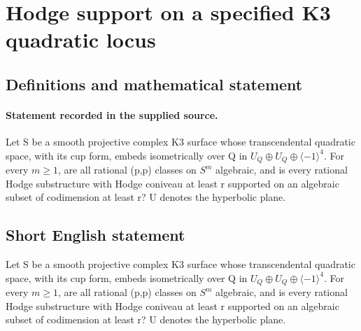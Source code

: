 \documentclass[11pt]{article}
\begin{document}
\section*{Hodge support on a specified K3 quadratic locus}\label{statement}
\subsection{Definitions and mathematical statement}
\paragraph{Statement recorded in the supplied source.}
Let S be a smooth projective complex K3 surface whose transcendental quadratic space, with its cup form, embeds isometrically over Q in $U_Q\oplus U_Q\oplus \langle -1\rangle ^{4}$. For every $m\geq 1$, are all rational (p,p) classes on $S^m$ algebraic, and is every rational Hodge substructure with Hodge coniveau at least r supported on an algebraic subset of codimension at least r? U denotes the hyperbolic plane.
\subsection{Short English statement}
Let S be a smooth projective complex K3 surface whose transcendental quadratic space, with its cup form, embeds isometrically over Q in $U_Q\oplus U_Q\oplus \langle -1\rangle ^{4}$. For every $m\geq 1$, are all rational (p,p) classes on $S^m$ algebraic, and is every rational Hodge substructure with Hodge coniveau at least r supported on an algebraic subset of codimension at least r? U denotes the hyperbolic plane.
\end{document}
